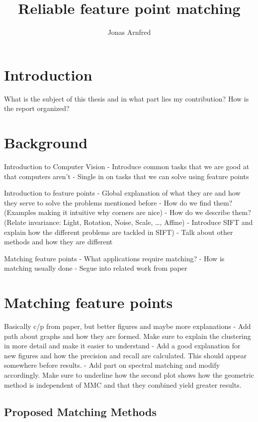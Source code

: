 \documentclass{article}
\begin{document}
\title{Reliable feature point matching}
\author{Jonas Arnfred}

\maketitle

\section{Introduction}
What is the subject of this thesis and in what part lies my 
contribution?
How is the report organized?

\section{Background}
Introduction to Computer Vision
 - Introduce common tasks that we are good at that computers aren't
 - Single in on tasks that we can solve using feature points

Introduction to feature points
 - Global explanation of what they are and how they serve to solve the 
problems mentioned before
 - How do we find them? (Examples making it intuitive why corners are 
nice)
 - How do we describe them? (Relate invariance: Light, Rotation, Noise, 
 Scale, \ldots, Affine)
 - Introduce SIFT and explain how the different problems are tackled in 
SIFT)
 - Talk about other methods and how they are different

Matching feature points
 - What applications require matching?
 - How is matching usually done
 - Segue into related work from paper

\section{Matching feature points}
Basically c/p from paper, but better figures and maybe more explanations
 - Add path about graphs and how they are formed. Make sure to explain 
 the clustering in more detail and make it easier to understand
 - Add a good explanation for new figures and how the precision and 
 recall are calculated. This should appear somewhere before results.
 - Add part on spectral matching and modify accordingly. Make sure to 
 underline how the second plot shows how the geometric method is 
 independent of MMC and that they combined yield greater results.

\subsection{Proposed Matching Methods}
\label{S:MatchingMethods}
\end{document}
